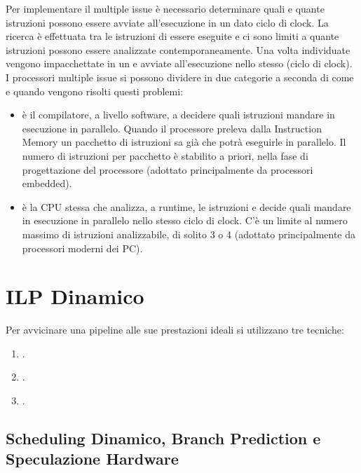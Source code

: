 Per implementare il multiple issue è necessario determinare quali e quante istruzioni possono 
essere avviate all'esecuzione in un dato ciclo di clock. La ricerca è effettuata tra le istruzioni  di essere eseguite e ci sono limiti a quante istruzioni possono essere
analizzate contemporaneamente. Una volta individuate vengono impacchettate in un  e avviate all'esecuzione nello stesso  (ciclo di clock).
I processori multiple issue si possono dividere in due categorie a seconda di come e quando vengono risolti questi problemi: 

\begin{itemize}
  \item {} è il compilatore, a livello software, a decidere quali istruzioni mandare in esecuzione in parallelo. Quando il processore preleva dalla Instruction Memory un pacchetto di istruzioni sa già che potrà eseguirle in parallelo. Il numero di istruzioni per pacchetto è stabilito a priori, nella fase di progettazione del processore (adottato principalmente da processori embedded). 
\item {} è la CPU stessa che analizza, a runtime, le istruzioni e decide quali mandare in esecuzione in parallelo nello stesso ciclo di clock. C'è un limite al numero massimo di istruzioni analizzabile, di solito 3 o 4 (adottato principalmente da processori moderni dei PC).
\end{itemize} 


\section{ILP Dinamico}

Per avvicinare una pipeline alle sue prestazioni ideali si utilizzano tre tecniche:

\begin{enumerate}
  \item {}. 
  \item {}. 
  \item {}.
\end{enumerate}

\subsection{Scheduling Dinamico, Branch Prediction e Speculazione Hardware}

